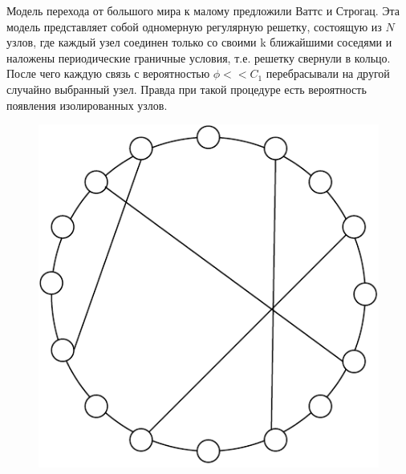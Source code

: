 \documentclass[a4paper]{article}
\begin{document}
Модель перехода от большого мира к малому предложили Ваттс и Строгац. Эта модель представляет собой одномерную регулярную решетку, состоящую из $N$ узлов,
 где каждый узел соединен только со своими k ближайшими соседями и наложены периодические граничные условия, т.е. решетку свернули в кольцо. После чего каждую связь с вероятностью $\phi << C_1$ перебрасывали на другой случайно выбранный узел.
 Правда при такой процедуре есть вероятность появления изолированных узлов.

 \begin{figure}[H]
    \begin{center}
	\begin{minipage}[h]{0.4\linewidth}
	\includegraphics[width=1\linewidth]{2соседа.pdf}
	\end{minipage}
	\hfill 
	\begin{minipage}[h]{0.4\linewidth}

\end{minipage}
\end{center}
\end{figure}
\end{document}
